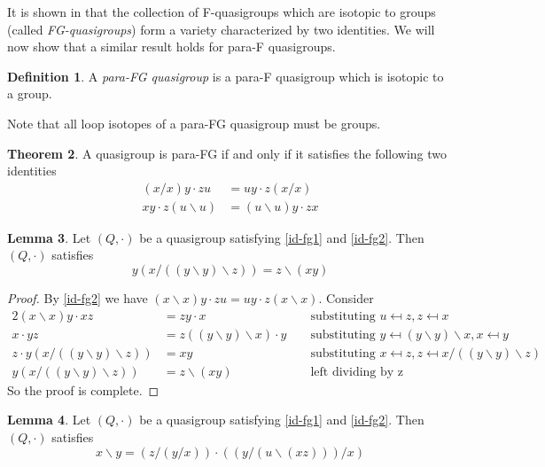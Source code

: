 \documentclass[12pt, twoside, openright]{report}
\theoremstyle{definition}
\newtheorem{thm}{Theorem}[chapter]
\newtheorem{lem}[thm]{Lemma}
\newtheorem{dfn}[thm]{Definition}
\newcommand{\ldv}{\backslash}       %
\newcommand{\rdv}{/}                %
\begin{document}
It is shown in \cite{FG} that the collection of F-quasigroups which are isotopic to groups
  (called \emph{FG-quasigroups}) form a variety characterized by two identities. We will now
  show that a similar result holds for para-F quasigroups.

\begin{dfn}
  A \emph{para-FG quasigroup} is a para-F quasigroup which is isotopic to a group.
\end{dfn}

Note that all loop isotopes of a para-FG quasigroup must be groups.

\begin{thm}\label{thm-para-FG}
  A quasigroup is para-FG if and only if it satisfies the following two identities
  \begin{align*}
    (x\rdv x)y\cdot zu &= uy\cdot z(x\rdv x)\label{id-fg1} \tag{FG1}\\
    xy\cdot z(u\ldv u) &= (u\ldv u)y\cdot zx\label{id-fg2} \tag{FG2}
  \end{align*}
\end{thm}

\begin{lem}\label{lem-33}
  Let $(Q, \cdot)$ be a quasigroup satisfying \ref{id-fg1} and \ref{id-fg2}. Then $(Q, \cdot)$ satisfies
  \[y(x\rdv((y\ldv y)\ldv z)) = z\ldv(xy)\]
\end{lem}

\begin{proof}
  By \ref{id-fg2} we have $(x\ldv x)y\cdot zu = uy\cdot z(x\ldv x)$. Consider
  \begin{alignat*}{2}
    (x\ldv x)y\cdot xz &= zy\cdot x &&\text{ substituting $u\mapsfrom z, z\mapsfrom x$}\\
    x\cdot yz &= z((y\ldv y)\ldv x)\cdot y &&\text{ substituting
      $y\mapsfrom (y\ldv y)\ldv x, x\mapsfrom y$}\\
    z\cdot y(x\rdv((y\ldv y)\ldv z)) &= xy &&\text{ substituting
      $x\mapsfrom z, z\mapsfrom x\rdv((y\ldv y)\ldv z)$}\\
    y(x\rdv((y\ldv y)\ldv z)) &= z\ldv(xy) &&\text{ left dividing by z}
  \end{alignat*}
  So the proof is complete.
\end{proof}

\begin{lem}\label{lem-34}
  Let $(Q, \cdot)$ be a quasigroup satisfying \ref{id-fg1} and \ref{id-fg2}. Then $(Q, \cdot)$ satisfies
  \[x\ldv y = (z\rdv (y\rdv x))\cdot ((y\rdv (u\ldv(xz)))\rdv x)\]
\end{lem}
\end{document}
